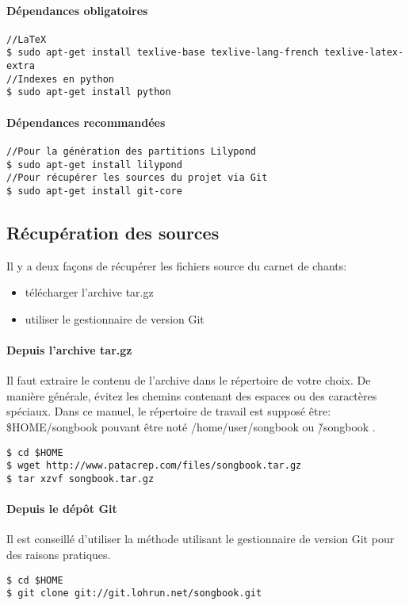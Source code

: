 \documentclass[a4paper]{article}
\begin{document}
\paragraph{Dépendances obligatoires}
\begin{verbatim}
//LaTeX
$ sudo apt-get install texlive-base texlive-lang-french texlive-latex-extra
//Indexes en python
$ sudo apt-get install python
\end{verbatim}

\paragraph{Dépendances recommandées}
\begin{verbatim}
//Pour la génération des partitions Lilypond
$ sudo apt-get install lilypond
//Pour récupérer les sources du projet via Git
$ sudo apt-get install git-core
\end{verbatim}

\subsection{Récupération des sources}

Il y a deux façons de récupérer les fichiers source du carnet de
chants:
\begin{itemize}
\item télécharger l'archive tar.gz
\item utiliser le gestionnaire de version Git
\end{itemize}

\paragraph{Depuis l'archive tar.gz}
Il faut extraire le contenu de l'archive dans le répertoire de votre
choix. De manière générale, évitez les chemins contenant des espaces
ou des caractères spéciaux. Dans ce manuel, le répertoire de travail
est supposé être: \$HOME/songbook pouvant être noté
/home/user/songbook ou \~/songbook .
\begin{verbatim}
$ cd $HOME
$ wget http://www.patacrep.com/files/songbook.tar.gz
$ tar xzvf songbook.tar.gz
\end{verbatim}

\paragraph{Depuis le dépôt Git}
Il est conseillé d'utiliser la méthode utilisant le gestionnaire de
version Git pour des raisons pratiques.
\begin{verbatim}
$ cd $HOME
$ git clone git://git.lohrun.net/songbook.git
\end{verbatim}
\end{document}
